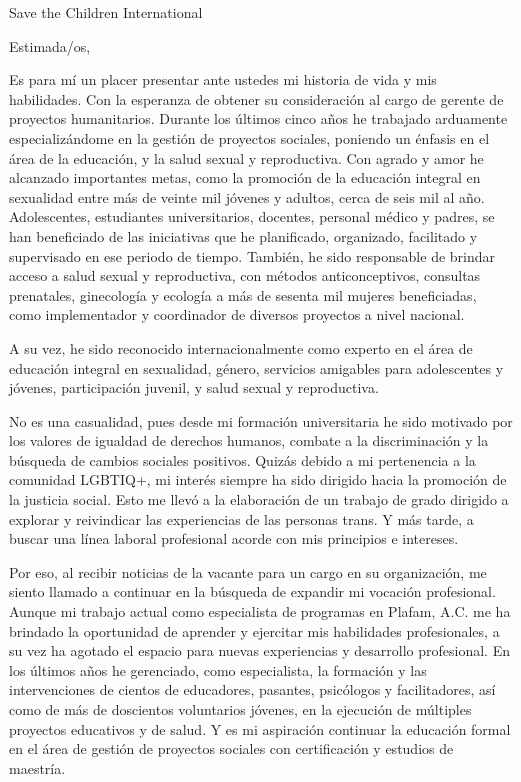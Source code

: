 \documentclass[draft=false]{scrlttr2}
\begin{document}
    \begin{letter}{Save the Children International}

\opening{Estimada/os,}

Es para mí un placer presentar ante ustedes mi historia de vida y mis habilidades.
Con la esperanza de obtener su consideración al cargo de gerente de proyectos humanitarios.
Durante los últimos cinco años he trabajado arduamente especializándome en la gestión de proyectos sociales, poniendo un énfasis en el área de la educación, y la salud sexual y reproductiva.
Con agrado y amor he alcanzado importantes metas, como la promoción de la educación integral en sexualidad entre más de veinte mil jóvenes y adultos, cerca de seis mil al año.
Adolescentes, estudiantes universitarios, docentes, personal médico y padres, se han beneficiado de las iniciativas que he planificado, organizado, facilitado y supervisado en ese periodo de tiempo.
También, he sido responsable de brindar acceso a salud sexual y reproductiva, con métodos anticonceptivos, consultas prenatales, ginecología y ecología a más de sesenta mil mujeres beneficiadas, como implementador y coordinador de diversos proyectos a nivel nacional.

A su vez, he sido reconocido internacionalmente como experto en el área de educación integral en sexualidad, género, servicios amigables para adolescentes y jóvenes, participación juvenil, y salud sexual y reproductiva.

No es una casualidad, pues desde mi formación universitaria he sido motivado por los valores de igualdad de derechos humanos, combate a la discriminación y la búsqueda de cambios sociales positivos.
Quizás debido a mi pertenencia a la comunidad LGBTIQ+, mi interés siempre ha sido dirigido hacia la promoción de la justicia social.
Esto me llevó a la elaboración de un trabajo de grado dirigido a explorar y reivindicar las experiencias de las personas trans.
Y más tarde, a buscar una línea laboral profesional acorde con mis principios e intereses.

Por eso, al recibir noticias de la vacante para un cargo en su organización, me siento llamado a continuar en la búsqueda de expandir mi vocación profesional.
Aunque mi trabajo actual como especialista de programas en Plafam, A.C. me ha brindado la oportunidad de aprender y ejercitar mis habilidades profesionales, a su vez ha agotado el espacio para nuevas experiencias y desarrollo profesional.
En los últimos años he gerenciado, como especialista, la formación y las intervenciones de cientos de educadores, pasantes, psicólogos y facilitadores, así como de más de doscientos voluntarios jóvenes, en la ejecución de múltiples proyectos educativos y de salud.
Y es mi aspiración continuar la educación formal en el área de gestión de proyectos sociales con certificación y estudios de maestría.


\end{letter}
\end{document}
